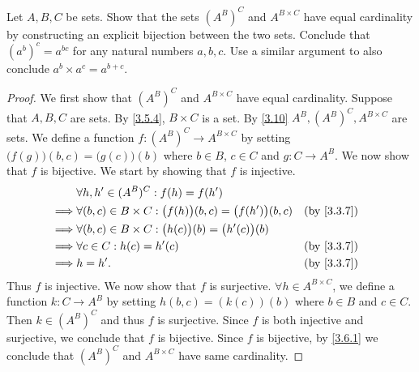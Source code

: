 \begin{ex}\label{ex:3.6.6}
  Let \(A, B, C\) be sets.
  Show that the sets \((A^B)^C\) and \(A^{B \times C}\) have equal cardinality by constructing an explicit bijection between the two sets.
  Conclude that \((a^b)^c = a^{bc}\) for any natural numbers \(a, b, c\).
  Use a similar argument to also conclude \(a^b \times a^c = a^{b+c}\).
\end{ex}

\begin{proof}
  We first show that \((A^B)^C\) and \(A^{B \times C}\) have equal cardinality.
  Suppose that \(A, B, C\) are sets.
  By \cref{3.5.4}, \(B \times C\) is a set.
  By \cref{3.10} \(A^B, (A^B)^C, A^{B \times C}\) are sets.
  We define a function \(f : (A^B)^C \to A^{B \times C}\) by setting \(\big(f(g)\big)(b, c) = \big(g(c)\big)(b)\) where \(b \in B\), \(c \in C\) and \(g : C \to A^B\).
  We now show that \(f\) is bijective.
  We start by showing that \(f\) is injective.
  \begin{align*}
             & \forall h, h' \in (A^B)^C : f(h) = f(h')                                                                   \\
    \implies & \forall (b, c) \in B \times C : \big(f(h)\big)(b, c) = \big(f(h')\big)(b, c) &  & \text{(by \cref{3.3.7})} \\
    \implies & \forall (b, c) \in B \times C : \big(h(c)\big)(b) = \big(h'(c)\big)(b)                                     \\
    \implies & \forall c \in C : h(c) = h'(c)                                               &  & \text{(by \cref{3.3.7})} \\
    \implies & h = h'.                                                                      &  & \text{(by \cref{3.3.7})}
  \end{align*}
  Thus \(f\) is injective.
  We now show that \(f\) is surjective.
  \(\forall h \in A^{B \times C}\), we define a function \(k : C \to A^B\) by setting \(h(b, c) = (k(c))(b)\) where \(b \in B\) and \(c \in C\).
  Then \(k \in (A^B)^C\) and thus \(f\) is surjective.
  Since \(f\) is both injective and surjective, we conclude that \(f\) is bijective.
  Since \(f\) is bijective, by \cref{3.6.1} we conclude that \((A^B)^C\) and \(A^{B \times C}\) have same cardinality.


\end{proof}
